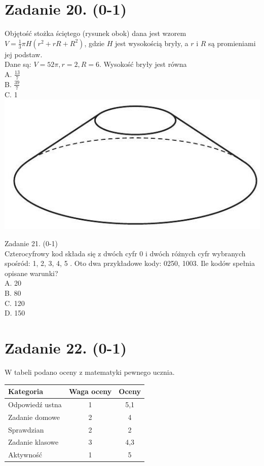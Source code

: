 \documentclass[10pt]{article}
\begin{document}
\section*{Zadanie 20. (0-1)}
Objętość stożka ściętego (rysunek obok) dana jest wzorem \(V=\frac{1}{3} \pi H\left(r^{2}+r R+R^{2}\right)\), gdzie \(H\) jest wysokością bryły, a \(r\) i \(R\) są promieniami jej podstaw.\\
Dane są: \(V=52 \pi, r=2, R=6\). Wysokość bryły jest równa\\
A. \(\frac{13}{7}\)\\
B. \(\frac{39}{7}\)\\
C. 1\\
\includegraphics[max width=\textwidth, center]{2024_11_21_dd21f7544b65bcf1b3c7g-08}

Zadanie 21. (0-1)\\
Czterocyfrowy kod składa się z dwóch cyfr 0 i dwóch różnych cyfr wybranych spośród: 1, 2, 3, 4, 5 . Oto dwa przykładowe kody: 0250, 1003. Ile kodów spełnia opisane warunki?\\
A. 20\\
B. 80\\
C. 120\\
D. 150

\section*{Zadanie 22. (0-1)}
W tabeli podano oceny z matematyki pewnego ucznia.

\begin{center}
\begin{tabular}{|l|c|c|}
\hline
Kategoria & Waga oceny & Oceny \\
\hline
Odpowiedź ustna & 1 & 5,1 \\
\hline
Zadanie domowe & 2 & 4 \\
\hline
Sprawdzian & 2 & 2 \\
\hline
Zadanie klasowe & 3 & 4,3 \\
\hline
Aktywność & 1 & 5 \\
\hline
\end{tabular}
\end{center}
\end{document}
